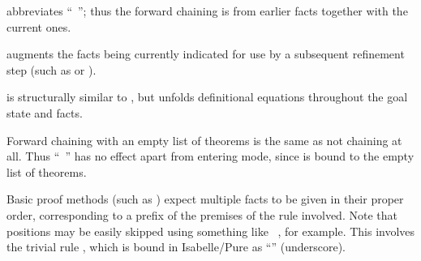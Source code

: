 \begin{isabellebody}
\begin{isamarkuptext}
\begin{descr}
  \item [\mbox{\isa{\isacommand{with}}}~\isa{{\isachardoublequote}b\isactrlsub {\isadigit{1}}\ {\isasymdots}\ b\isactrlsub n{\isachardoublequote}}]
  abbreviates ``\mbox{}~''; thus the forward chaining is from earlier facts together
  with the current ones.
  
  \item [\mbox{\isa{\isacommand{using}}}~\isa{{\isachardoublequote}b\isactrlsub {\isadigit{1}}\ {\isasymdots}\ b\isactrlsub n{\isachardoublequote}}] augments
  the facts being currently indicated for use by a subsequent
  refinement step (such as \mbox{} or \mbox{}).
  
  \item [\mbox{\isa{\isacommand{unfolding}}}~\isa{{\isachardoublequote}b\isactrlsub {\isadigit{1}}\ {\isasymdots}\ b\isactrlsub n{\isachardoublequote}}] is
  structurally similar to \mbox{}, but unfolds definitional
  equations  throughout the goal state
  and facts.

  \end{descr}

  Forward chaining with an empty list of theorems is the same as not
  chaining at all.  Thus ``\mbox{}~'' has no
  effect apart from entering  mode, since
  \mbox{} is bound to the empty list of theorems.

  Basic proof methods (such as \mbox{}) expect multiple
  facts to be given in their proper order, corresponding to a prefix
  of the premises of the rule involved.  Note that positions may be
  easily skipped using something like \mbox{}~, for example.  This involves the trivial rule
  , which is bound in Isabelle/Pure as
  ``\mbox{\isa{{\isacharunderscore}}}'' (underscore).


\end{isamarkuptext}
\end{isabellebody}
